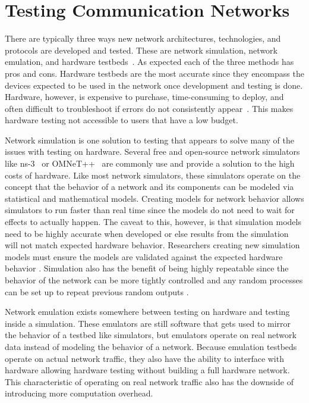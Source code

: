 \section{Testing Communication Networks} %
There are typically three ways new network architectures, technologies, and protocols are developed and tested. These are network simulation, network emulation, and hardware testbeds~\cite{simulation_emulation}.
As expected each of the three methods has pros and cons.
Hardware testbeds are the most accurate since they encompass the devices expected to be used in the network once development and testing is done.
Hardware, however, is expensive to purchase, time-consuming to deploy, and often difficult to troubleshoot if errors do not consistently appear~\cite{nsclick}.
This makes hardware testing not accessible to users that have a low budget. \par
Network simulation is one solution to testing that appears to solve many of the issues with testing on hardware.
Several free and open-source network simulators like ns-3~\cite{ns3} or OMNeT++~\cite{omnet++} are commonly use and provide a solution to the high costs of hardware.
Like most network simulators, these simulators operate on the concept that the behavior of a network and its components can be modeled via statistical and mathematical models.
Creating models for network behavior allows simulators to run faster than real time since the models do not need to wait for effects to actually happen.
The caveat to this, however, is that simulation models need to be highly accurate when developed or else results from the simulation will not match expected hardware behavior.
Researchers creating new simulation models must ensure the models are validated against the expected hardware behavior \cite{omnet_manager}.
Simulation also has the benefit of being highly repeatable since the behavior of the network can be more tightly controlled and any random processes can be set up to repeat previous random outputs \cite{simulation_emulation}. \par
Network emulation exists somewhere between testing on hardware and testing inside a simulation.
These emulators are still software that gets used to mirror the behavior of a testbed like simulators, but emulators operate on real network data instead of modeling the behavior of a network.
Because emulation testbeds operate on actual network traffic, they also have the ability to interface with hardware allowing hardware testing without building a full hardware network.
This characteristic of operating on real network traffic also has the downside of introducing more computation overhead.

